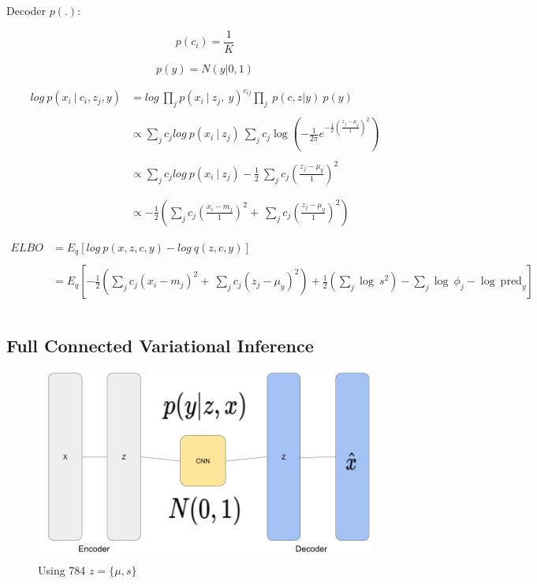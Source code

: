 \documentclass[12pt]{article}
\begin{document}
Decoder $p(.)$:


$$p(c_i) = \dfrac{1}{K}$$

$$p(y) = N(y|0,1)$$

\begin{align*}
log~p(x_i~\vert~c_i, z_{j},y) &= log~\prod_j p(x_i~\vert~z_j ,~y)^{c_{ij}} \prod_{j}~p(c,z|y) ~p(y)\\ \\
 &\propto \sum_j c_{j} log~p(x_i~\vert~z_j)~\sum_{j}c_{j}\log\left( -\frac{1}{2\pi}e^{-\frac{1}{2}\left( \frac{z_{j}-\mu_{y}}{1} \right)^2} \right) \\ \\
 &\propto \sum_j c_{j} log~p(x_i~\vert~z_j)  -\frac{1}{2}~\sum_{j}c_{j}\left( \frac{z_{j}-\mu_{y}}{1} \right)^2 \\ \\ \\
&\propto -\frac{1}{2}( \sum_j c_{j}\left( \frac{x_{i}-m_{j}}{1} \right)^2+~\sum_{j}c_{j}\left( \frac{z_{j}-\mu_{y}}{1} \right)^2)
\end{align*}


\begin{align*}
ELBO  &= E_q[log~p(x,z,c,y) - log~q(z,c,y)] \\ \\
&= E_{q}[-\frac{1}{2}( \sum_j c_{j}\left( x_{i}-m_{j} \right)^2+~\sum_{j}c_{j}\left( z_{j}-\mu_{y} \right)^2) + \frac{1}{2}\left(\sum_{j} \log~s^2  \right) - \sum_{j} \log~ \phi_{j} - \log~ \text{pred}_{y}] \\ \\
\end{align*}



\subsection{Full Connected Variational Inference}

\begin{figure}[H]
    \centering
    \includegraphics[width=0.5\linewidth]{../fig/Full connected Variational Inference.png} %
    \caption{Using 784 $z=\{ \mu,s \}$ }
    \label{fig:full_connected}
\end{figure}
\end{document}
